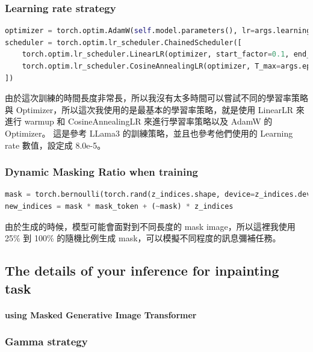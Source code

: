 \subsubsection{Learning rate strategy}



\begin{lstlisting}[language=Python, caption=學習率策略實作]
optimizer = torch.optim.AdamW(self.model.parameters(), lr=args.learning_rate)
scheduler = torch.optim.lr_scheduler.ChainedScheduler([
    torch.optim.lr_scheduler.LinearLR(optimizer, start_factor=0.1, end_factor=1.0, total_iters=args.warmup_epochs),
    torch.optim.lr_scheduler.CosineAnnealingLR(optimizer, T_max=args.epochs-args.warmup_epochs)
])
\end{lstlisting}

由於這次訓練的時間長度非常長，所以我沒有太多時間可以嘗試不同的學習率策略與 Optimizer，所以這次我使用的是最基本的學習率策略，就是使用 LinearLR 來進行 warmup 和 CosineAnnealingLR 來進行學習率策略以及 AdamW 的 Optimizer。 這是參考 LLama3 的訓練策略，並且也參考他們使用的 Learning rate 數值，設定成 8.0e-5。


\subsubsection{Dynamic Masking Ratio when training}




\begin{lstlisting}[language=Python, caption=動態遮罩比例實作]
mask = torch.bernoulli(torch.rand(z_indices.shape, device=z_indices.device) * 0.75 + 0.25).bool()
new_indices = mask * mask_token + (~mask) * z_indices
\end{lstlisting}


由於生成的時候，模型可能會面對到不同長度的 mask image，所以這裡我使用 25\% 到 100\% 的隨機比例生成 mask，可以模擬不同程度的訊息彌補任務。



\subsection{The details of your inference for inpainting task }

\paragraph{using Masked Generative Image Transformer}
\subsubsection{Gamma strategy}


